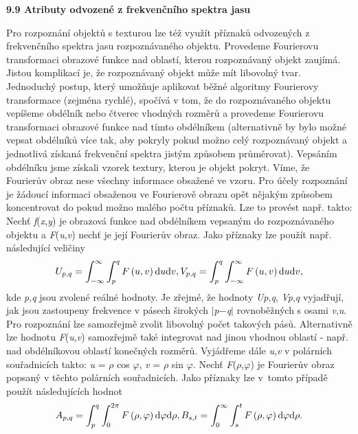 \noindent 

\noindent \textbf{9.9  Atributy odvozené z frekvenčního spektra jasu}

\noindent Pro rozpoznání objektů s texturou lze též využít příznaků odvozených z frekvenčního spektra jasu rozpoznávaného objektu. Provedeme Fourierovu transformaci obrazové funkce nad oblastí, kterou rozpoznávaný objekt zaujímá. Jistou komplikací je, že rozpoznávaný objekt může mít libovolný tvar. Jednoduchý postup, který umožňuje aplikovat běžné algoritmy Fourierovy transformace (zejména rychlé), spočívá v tom, že do rozpoznávaného objektu vepíšeme obdélník nebo čtverec vhodných rozměrů a provedeme Fourierovu transformaci obrazové funkce nad tímto obdélníkem (alternativně by bylo možné vepsat obdélníků více tak, aby pokryly pokud možno celý rozpoznávaný objekt a jednotlivá získaná frekvenční spektra jistým způsobem průměrovat). Vepsáním obdélníku jsme získali vzorek textury, kterou je objekt pokryt. Víme, že Fourierův obraz nese všechny informace obsažené ve vzoru. Pro účely rozpoznání je žádoucí informaci obsaženou ve Fourierově obrazu opět nějakým způsobem koncentrovat do pokud možno malého počtu příznaků. Lze to provést např. takto: Nechť \textit{f}(\textit{x},\textit{y}) je obrazová funkce nad obdélníkem vepsaným do rozpoznávaného objektu a \textit{F}(\textit{u},\textit{v}) nechť je její Fourierův obraz. Jako příznaky lze použít např. následující veličiny
\begin{equation} \label{GrindEQ__9_25_} 
U_{p,q} =\int _{-\infty }^{\infty }\int _{p}^{q}F\left(u,v\right){\rm d}u {\rm d}v ,     V_{p,q} =\int _{p}^{q}\int _{-\infty }^{\infty }F\left(u,v\right){\rm d}u {\rm d}v ,  
\end{equation} 
kde \textit{p},\textit{q} jsou zvolené reálné hodnoty. Je zřejmé, že hodnoty \textit{Up},\textit{q}, \textit{Vp},\textit{q} vyjadřují, jak jsou zastoupeny frekvence v pásech širokých $\mid$\textit{p}$-$\textit{q}$\mid$ rovnoběžných s osami \textit{v},\textit{u}. Pro rozpoznání lze samozřejmě zvolit libovolný počet takových pásů. Alternativně lze hodnotu \textit{F}(\textit{u},\textit{v}) samozřejmě také integrovat nad jinou vhodnou oblastí - např. nad obdélníkovou oblastí konečných rozměrů. Vyjádřeme dále \textit{u},\textit{v} v polárních souřadnicích takto: \textit{u} = $\rho$ cos $\varphi$, \textit{v} = $\rho$ sin $\varphi$. Nechť \textit{F}($\rho$,$\varphi$) je Fourierův obraz popsaný v těchto polárních souřadnicích. Jako příznaky lze v~tomto případě použít následujících hodnot
\begin{equation} \label{GrindEQ__9_26_} 
A_{p,q} =\int _{p}^{q}\int _{0}^{2\pi }F\left(\rho ,\varphi \right){\rm d}\varphi  {\rm d}\rho  ,     B_{s,t} =\int _{0}^{\infty }\int _{s}^{t}F\left(\rho ,\varphi \right){\rm d}\varphi  {\rm d}\rho  .  
\end{equation} 
